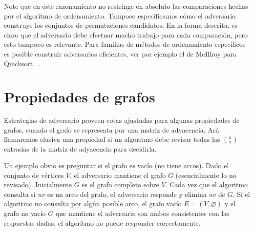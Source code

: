  Note que en este razonamiento no restringe en absoluto
  las comparaciones hechas por el algoritmo de ordenamiento.
  Tampoco especificamos
  cómo el adversario construye los conjuntos de permutaciones candidatos.
  En la forma descrita,
  es claro que el adversario
  debe efectuar mucho trabajo para cada comparación,
  pero esto tampoco es relevante.
  Para familias de métodos de ordenamiento específicos
  es posible construir adversarios eficientes,
  ver por ejemplo el de McIllroy para Quicksort~%
    \cite{mcillroy99:_killer_adver_quicksort}.

\section{Propiedades de grafos}
\label{sec:graph-properties}

  Estrategias de adversario proveen cotas ajustadas
  para algunas propiedades de grafos,
  cuando el grafo se representa por una matriz de adyacencia.
  Acá llamaremos elusiva una propiedad
  si un algoritmo
  debe revisar todas las \(\binom{n}{2}\) entradas de la matriz de adyacencia
  para decidirla.

  Un ejemplo obvio es preguntar si el grafo es vacío
  (no tiene arcos).
  Dado el conjunto de vértices \(V\),
  el adversario mantiene el grafo \(G\)
  (esencialmente lo no revisado).
  Inicialmente \(G\) es el grafo completo sobre \(V\).
  Cada vez que el algoritmo consulta si \(u v\) es un arco del grafo,
  el adversario responde  y elimina \(u v\) de \(G\).
  Si el algoritmo no consulta por algún posible arco,
  el grafo vacío \(E = (V, \varnothing)\)
  y el grafo no vacío \(G\) que mantiene el adversario
  son ambos consistentes con las respuestas dadas,
  el algoritmo no puede responder correctamente.

